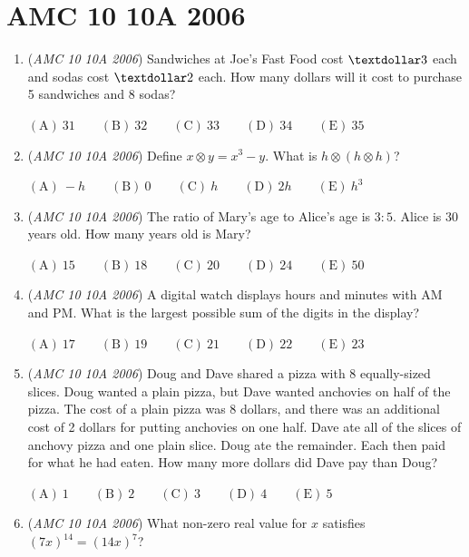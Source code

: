 \section{AMC 10 10A 2006}
        \begin{enumerate}
        	\item (\textit{AMC 10 10A 2006}) Sandwiches at Joe's Fast Food cost $\textdollar 3$ each and sodas cost $\textdollar 2$ each. How many dollars will it cost to purchase 5 sandwiches and 8 sodas?


 $\mathrm{(A)}\ 31\qquad\mathrm{(B)}\ 32\qquad\mathrm{(C)}\ 33\qquad\mathrm{(D)}\ 34\qquad\mathrm{(E)}\ 35$


	\item (\textit{AMC 10 10A 2006}) Define $x\otimes y=x^3-y$. What is $h\otimes (h\otimes h)$?


 $\mathrm{(A)}\ -h\qquad \mathrm{(B)}\ 0\qquad \mathrm{(C)}\ h\qquad \mathrm{(D)}\ 2h\qquad\mathrm{(E)}\ h^3$


	\item (\textit{AMC 10 10A 2006}) The ratio of Mary's age to Alice's age is $3:5$. Alice is $30$ years old. How many years old is Mary?


 $\mathrm{(A)}\ 15\qquad\mathrm{(B)}\ 18\qquad\mathrm{(C)}\ 20\qquad\mathrm{(D)}\ 24\qquad\mathrm{(E)}\ 50$


	\item (\textit{AMC 10 10A 2006}) A digital watch displays hours and minutes with AM and PM.  What is the largest possible sum of the digits in the display?


 $\mathrm{(A)}\ 17\qquad\mathrm{(B)}\ 19\qquad\mathrm{(C)}\ 21\qquad\mathrm{(D)}\ 22\qquad\mathrm{(E)}\ 23$


	\item (\textit{AMC 10 10A 2006}) Doug and Dave shared a pizza with 8 equally-sized slices.  Doug wanted a plain pizza, but Dave wanted anchovies on half of the pizza.  The cost of a plain pizza was 8 dollars, and there was an additional cost of 2 dollars for putting anchovies on one half.  Dave ate all of the slices of anchovy pizza and one plain slice.  Doug ate the remainder.  Each then paid for what he had eaten.  How many more dollars did Dave pay than Doug?


 $\mathrm{(A)}\ 1\qquad\mathrm{(B)}\ 2\qquad\mathrm{(C)}\ 3\qquad\mathrm{(D)}\ 4\qquad\mathrm{(E)}\ 5$


	\item (\textit{AMC 10 10A 2006}) What non-zero real value for $x$ satisfies $(7x)^{14}=(14x)^7$?



\end{enumerate}
